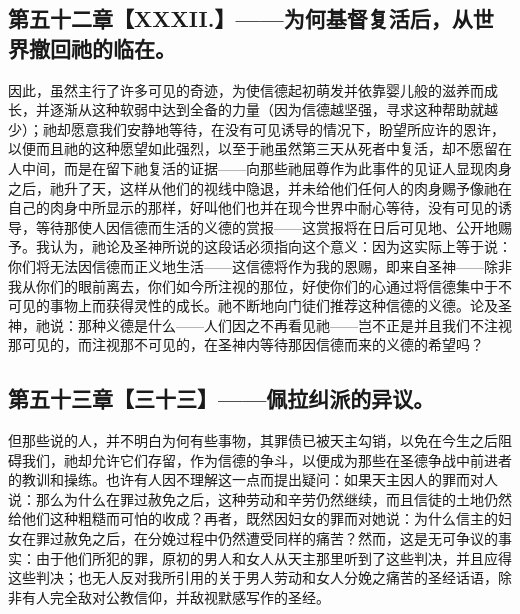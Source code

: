 
\subsection{第五十二章【XXXII.】——为何基督复活后，从世界撤回祂的临在。}

因此，虽然主行了许多可见的奇迹，为使信德起初萌发并依靠婴儿般的滋养而成长，并逐渐从这种软弱中达到全备的力量（因为信德越坚强，寻求这种帮助就越少）；祂却愿意我们安静地等待，在没有可见诱导的情况下，盼望所应许的恩许，以便而且祂的这种愿望如此强烈，以至于祂虽然第三天从死者中复活，却不愿留在人中间，而是在留下祂复活的证据——向那些祂屈尊作为此事件的见证人显现肉身之后，祂升了天，这样从他们的视线中隐退，并未给他们任何人的肉身赐予像祂在自己的肉身中所显示的那样，好叫他们也并在现今世界中耐心等待，没有可见的诱导，等待那使人因信德而生活的义德的赏报——这赏报将在日后可见地、公开地赐予。我认为，祂论及圣神所说的这段话必须指向这个意义：因为这实际上等于说：你们将无法因信德而正义地生活——这信德将作为我的恩赐，即来自圣神——除非我从你们的眼前离去，你们如今所注视的那位，好使你们的心通过将信德集中于不可见的事物上而获得灵性的成长。祂不断地向门徒们推荐这种信德的义德。论及圣神，祂说：那种义德是什么——人们因之不再看见祂——岂不正是并且我们不注视那可见的，而注视那不可见的，在圣神内等待那因信德而来的义德的希望吗？\par


\subsection{第五十三章【三十三】——佩拉纠派的异议。}

但那些说的人，并不明白为何有些事物，其罪债已被天主勾销，以免在今生之后阻碍我们，祂却允许它们存留，作为信德的争斗，以便成为那些在圣德争战中前进者的教训和操练。也许有人因不理解这一点而提出疑问：如果天主因人的罪而对人说：那么为什么在罪过赦免之后，这种劳动和辛劳仍然继续，而且信徒的土地仍然给他们这种粗糙而可怕的收成？再者，既然因妇女的罪而对她说：为什么信主的妇女在罪过赦免之后，在分娩过程中仍然遭受同样的痛苦？然而，这是无可争议的事实：由于他们所犯的罪，原初的男人和女人从天主那里听到了这些判决，并且应得这些判决；也无人反对我所引用的关于男人劳动和女人分娩之痛苦的圣经话语，除非有人完全敌对公教信仰，并敌视默感写作的圣经。\par

